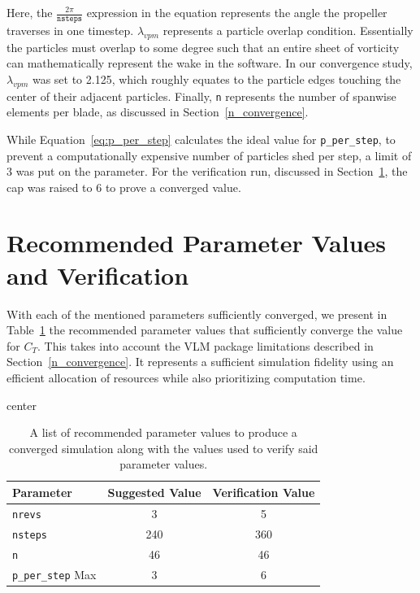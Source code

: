 \documentclass{report}
\begin{document}
Here, the $\frac{2 \pi}{\texttt{nsteps}}$ expression in the equation represents the angle the propeller traverses in one timestep.
$\lambda_{vpm}$ represents a particle overlap condition. Essentially the particles must overlap to some degree such that an entire sheet of vorticity can mathematically represent the wake in the software.
In our convergence study, $\lambda_{vpm}$ was set to 2.125, which roughly equates to the particle edges touching the center of their adjacent particles.
Finally, \texttt{n} represents the number of spanwise elements per blade, as discussed in Section~\ref{n_convergence}.

While Equation~\ref{eq:p_per_step} calculates the ideal value for \texttt{p\_per\_step}, to prevent a computationally expensive number of particles shed per step, a limit of 3 was put on the parameter.
For the verification run, discussed in Section~\ref{Verification}, the cap was raised to 6 to prove a converged value. 

\section{Recommended Parameter Values and Verification}\label{Verification}
With each of the mentioned parameters sufficiently converged, we present in Table~\ref{tab:suggested} the recommended parameter values that sufficiently converge the value for $C_T$.
This takes into account the VLM package limitations described in Section~\ref{n_convergence}. It represents a sufficient simulation fidelity using an efficient allocation of resources while also prioritizing computation time.
\begin{table}[H]
    \centering
    \caption{A list of recommended parameter values to produce a converged simulation along with the values used to verify said parameter values.}\label{tab:suggested}
    \begin{adjustbox}{center}
    \begin{tabular}{l c c}
        \toprule
        \textbf{Parameter} & \textbf{Suggested Value} & \textbf{Verification Value} \\
        \midrule
        \texttt{nrevs} & 3 &  5 \\
        \texttt{nsteps} & 240 & 360 \\
        \texttt{n} & 46  & 46 \\
        \texttt{p\_per\_step} Max & 3 & 6 \\
        \bottomrule
    \end{tabular}
    \end{adjustbox}
\end{table}
\end{document}
